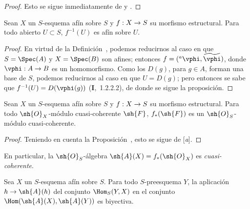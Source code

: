 \documentclass[oneside,10pt]{amsart}
\makeatletter
\newcommand{\ega@arrow}[2]{\mathchoice{#1}{#2}{#2}{#2}}
\renewcommand{\to}{\ega@arrow{\longrightarrow}{\rightarrow}}
\let\EGAOriginalLabel\label
\renewcommand{\label}[1]{\phantomsection\EGAOriginalLabel{#1}}
\makeatother
\begin{document}
\begin{proof}
Esto se sigue inmediatamente de  y .
\end{proof}

\begin{proposition}[1.2.5]
\label{II.1.2.5}
Sean $X$ un $S$-esquema afín sobre $S$ y $f:X\to S$ su morfismo estructural.
Para todo abierto $U\subset S$, $f^{-1}(U)$ es afín sobre $U$.
\end{proposition}

\begin{proof}
En virtud de la Definición~, podemos reducirnos al caso en que $S=\Spec(A)$ y $X=\Spec(B)$ son afines; entonces $f=({}^a\vphi,\widetilde{\vphi})$, donde $\vphi:A\to B$ es un homomorfismo.
Como los $D(g)$, para $g\in A$, forman una base de $S$, podemos reducirnos al caso en que $U=D(g)$; pero entonces se sabe que $f^{-1}(U)=D(\vphi(g))$ (\textbf{I},~1.2.2.2), de donde se sigue la proposición.
\end{proof}

\begin{proposition}[1.2.6]
\label{II.1.2.6}
Sean $X$ un $S$-esquema afín sobre $S$ y $f:X\to S$ su morfismo estructural.
Para todo $\sh{O}_X$-módulo cuasi-coherente $\sh{F}$, $f_*(\sh{F})$ es un $\sh{O}_S$-módulo cuasi-coherente.
\end{proposition}

\begin{proof}
Teniendo en cuenta la Proposición~, esto se sigue de [\emph{a}].
\end{proof}

En particular, la $\sh{O}_S$-álgebra $\sh{A}(X)=f_*(\sh{O}_X)$ es \emph{cuasi-coherente}.

\begin{proposition}[1.2.7]
\label{II.1.2.7}
Sea $X$ un $S$-esquema afín sobre $S$.
Para todo $S$-preesquema $Y$, la aplicación $h\to\sh{A}(h)$ del conjunto $\Hom_S(Y,X)$ en el conjunto $\Hom(\sh{A}(X),\sh{A}(Y))$  es biyectiva.
\end{proposition}
\end{document}
